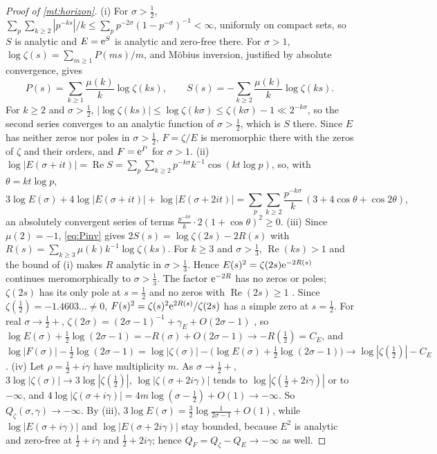 \documentclass[11pt]{article}
\theoremstyle{definition}\newtheorem{definition}[theorem]{Definition}
\theoremstyle{remark}\newtheorem{remark}[theorem]{Remark}
\theoremstyle{definition}\newtheorem{axiom}{Axiom}
\renewcommand{\Re}{\operatorname{Re}}\renewcommand{\Im}{\operatorname{Im}}
\begin{document}
\begin{proof}[Proof of \cref{mt:horizon}]
(i) For $\sigma>\frac12$, $\sum_p\sum_{k\ge2}|p^{-ks}|/k\le\sum_pp^{-2\sigma}(1-p^{-\sigma})^{-1}<\infty$, uniformly on compact sets, so $S$ is analytic and $E=\mathrm e^S$ is analytic and zero-free there. For $\sigma>1$, $\log\zeta(s)=\sum_{m\ge1}P(ms)/m$, and Möbius inversion, justified by absolute convergence, gives
\begin{equation}\label{eq:Pinv}
P(s)=\sum_{k\ge1}\frac{\mu(k)}k\log\zeta(ks),\qquad S(s)=-\sum_{k\ge2}\frac{\mu(k)}k\log\zeta(ks).
\end{equation}
For $k\ge2$ and $\sigma>\frac12$, $|\log\zeta(ks)|\le\log\zeta(k\sigma)\le\zeta(k\sigma)-1\ll2^{-k\sigma}$, so the second series converges to an analytic function of $\sigma>\frac12$, which is $S$ there. Since $E$ has neither zeros nor poles in $\sigma>\frac12$, $F=\zeta/E$ is meromorphic there with the zeros of $\zeta$ and their orders, and $F=\mathrm e^P$ for $\sigma>1$.
(ii) $\log|E(\sigma+it)|=\Re S=\sum_p\sum_{k\ge2}p^{-k\sigma}k^{-1}\cos(kt\log p)$, so, with $\theta=kt\log p$,
\[
3\log E(\sigma)+4\log|E(\sigma+it)|+\log|E(\sigma+2it)|=\sum_p\sum_{k\ge2}\frac{p^{-k\sigma}}k\,(3+4\cos\theta+\cos2\theta),
\]
an absolutely convergent series of terms $\frac{p^{-k\sigma}}k\cdot2(1+\cos\theta)^2\ge0$.
(iii) Since $\mu(2)=-1$, \eqref{eq:Pinv} gives $2S(s)=\log\zeta(2s)-2R(s)$ with $R(s)=\sum_{k\ge3}\mu(k)k^{-1}\log\zeta(ks)$. For $k\ge3$ and $\sigma>\frac13$, $\Re(ks)>1$ and the bound of (i) makes $R$ analytic in $\sigma>\frac13$. Hence $E(s)^2=\zeta(2s)\mathrm e^{-2R(s)}$ continues meromorphically to $\sigma>\frac13$. The factor $\mathrm e^{-2R}$ has no zeros or poles; $\zeta(2s)$ has its only pole at $s=\frac12$ and no zeros with $\Re(2s)\ge1$ \cite[\S3.3]{Titchmarsh}. Since $\zeta(\frac12)=-1.4603\ldots\ne0$, $F(s)^2=\zeta(s)^2\mathrm e^{2R(s)}/\zeta(2s)$ has a simple zero at $s=\frac12$. For real $\sigma\to\frac12+$, $\zeta(2\sigma)=(2\sigma-1)^{-1}+\gamma_E+O(2\sigma-1)$ \cite[\S2.1]{Titchmarsh}, so $\log E(\sigma)+\frac12\log(2\sigma-1)=-R(\sigma)+O(2\sigma-1)\to-R(\frac12)=C_E$, and $\log|F(\sigma)|-\frac12\log(2\sigma-1)=\log|\zeta(\sigma)|-\bigl(\log E(\sigma)+\frac12\log(2\sigma-1)\bigr)\to\log|\zeta(\frac12)|-C_E$.
(iv) Let $\rho=\frac12+i\gamma$ have multiplicity $m$. As $\sigma\to\frac12+$, $3\log|\zeta(\sigma)|\to3\log|\zeta(\frac12)|$, $\log|\zeta(\sigma+2i\gamma)|$ tends to $\log|\zeta(\frac12+2i\gamma)|$ or to $-\infty$, and $4\log|\zeta(\sigma+i\gamma)|=4m\log(\sigma-\frac12)+O(1)\to-\infty$. So $Q_\zeta(\sigma,\gamma)\to-\infty$. By (iii), $3\log E(\sigma)=\frac32\log\frac1{2\sigma-1}+O(1)$, while $\log|E(\sigma+i\gamma)|$ and $\log|E(\sigma+2i\gamma)|$ stay bounded, because $E^2$ is analytic and zero-free at $\frac12+i\gamma$ and $\frac12+2i\gamma$; hence $Q_F=Q_\zeta-Q_E\to-\infty$ as well.
\end{proof}
\end{document}
